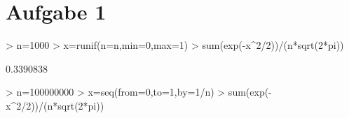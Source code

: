 

\section{Aufgabe 1}

\begin{Schunk}
\begin{Sinput}
> n=1000
> x=runif(n=n,min=0,max=1)
> sum(exp(-x^2/2))/(n*sqrt(2*pi))
\end{Sinput}
\begin{Soutput}
[1] 0.3390838
\end{Soutput}
\end{Schunk}

\begin{Schunk}
\begin{Sinput}
> n=100000000
> x=seq(from=0,to=1,by=1/n)
> sum(exp(-x^2/2))/(n*sqrt(2*pi))
\end{Sinput}
\end{Schunk}
